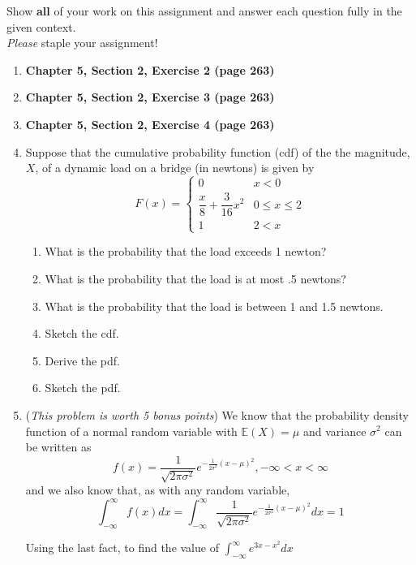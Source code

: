 \documentclass[11pt]{article}
\newcommand{\ben}{\begin{enumerate}}
\newcommand{\een}{\end{enumerate}}
\begin{document}
\pagestyle{fancy} 

Show \textbf{all} of your work on this assignment and answer each question fully in the given context. \\

\emph{Please} staple your assignment! \\

\ben


\item \textbf{Chapter 5, Section 2, Exercise 2 (page 263)}

\item \textbf{Chapter 5, Section 2, Exercise 3 (page 263)}

\item \textbf{Chapter 5, Section 2, Exercise 4 (page 263)}

 
\item Suppose that the cumulative probability function (cdf)
of the the magnitude, $X$, of a dynamic load on a bridge (in newtons) is given by
$$
F(x) = \begin{cases}
     0 & x < 0 \\
     \dfrac{x}{8} + \dfrac{3}{16}x^2 & 0 \leq x \leq 2\\
     1 & 2 < x
\end{cases}
$$
\ben
\item What is the probability that the load exceeds 1 newton?

\item What is the probability that the load is at most .5 newtons?

\item What is the probability that the load is between 1 and 1.5 newtons.

\item Sketch the cdf.

\item Derive the pdf.

\item Sketch the pdf.
\een 

 \item (\textit{This problem is worth 5 bonus points})
    We know that the probability density function of a normal random variable with $\mathbb{E}(X) = \mu$ and variance $\sigma^2$ can be written as
    $$
    f(x) = \frac{1}{\sqrt{2 \pi \sigma^2}} e^{-\frac{1}{2 \sigma^2 } (x - \mu)^2}, -\infty < x < \infty
    $$
    and we also know that, as with any random variable, 
    $$
    \int_{-\infty}^{\infty} f(x) dx  = \int_{-\infty}^{\infty} \frac{1}{\sqrt{2 \pi \sigma^2}} e^{-\frac{1}{2 \sigma^2 } (x - \mu)^2} dx  = 1
    $$

    Using the last fact, to find the value of $ \int_{-\infty}^{\infty} e^{3x -x^2} dx $
\een
\end{document}
